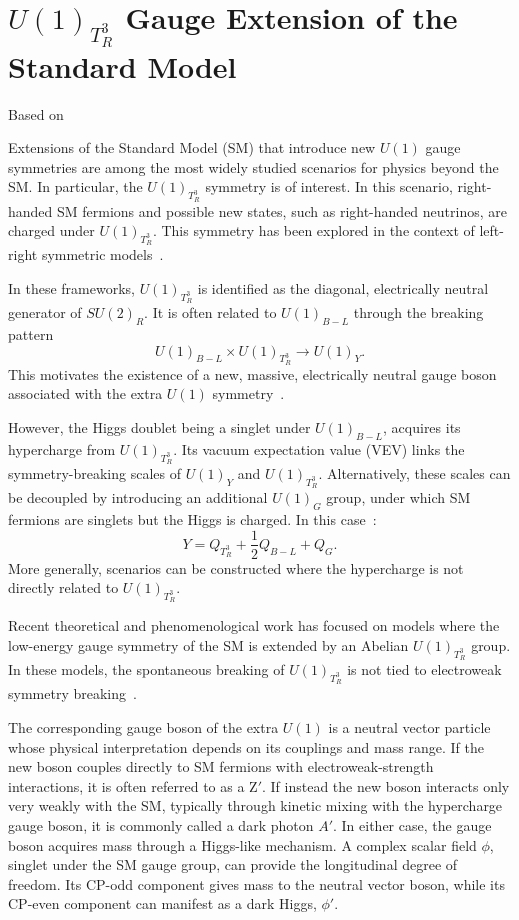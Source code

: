 \chapter{$U(1)_{T^3_R}$ Gauge Extension of the Standard Model}\label{ch:U1T3R}
\hfill{Based on~\parencite{Qureshi:2024naw}}

Extensions of the Standard Model (SM) that introduce new $U(1)$ gauge symmetries are among the most widely studied scenarios for physics beyond the SM. In particular, the $U(1)_{T^3_R}$ symmetry is of interest. In this scenario, right-handed SM fermions and possible new states, such as right-handed neutrinos, are charged under $U(1)_{T^3_R}$. This symmetry has been explored in the context of left-right symmetric models~\parencite{Assad:2017iib, MohapatraPati1975, SenjanovicMohapatra1975}.

In these frameworks, $U(1)_{T^3_R}$ is identified as the diagonal, electrically neutral generator of $SU(2)_R$. It is often related to $U(1)_{B-L}$ through the breaking pattern 
\[
U(1)_{B-L} \times U(1)_{T^3_R} \rightarrow U(1)_Y.
\]
This motivates the existence of a new, massive, electrically neutral gauge boson associated with the extra $U(1)$ symmetry~\parencite{DiLuzio2018, Baker2019, Michaels:2020fzj, Dev:2021otb, Florez2023}. 

However, the Higgs doublet being a singlet under $U(1)_{B-L}$, acquires its hypercharge from $U(1)_{T^3_R}$. Its vacuum expectation value (VEV) links the symmetry-breaking scales of $U(1)_Y$ and $U(1)_{T^3_R}$. Alternatively, these scales can be decoupled by introducing an additional $U(1)_G$ group, under which SM fermions are singlets but the Higgs is charged. In this case~\parencite{Dutta:2022qvn}:
\begin{equation}
Y=Q_{T^3_R}+\frac{1}{2}Q_{B-L} + Q_G.
\end{equation}
More generally, scenarios can be constructed where the hypercharge is not directly related to $U(1)_{T^3_R}$.

Recent theoretical and phenomenological work has focused on models where the low-energy gauge symmetry of the SM is extended by an Abelian $U(1)_{T^3_R}$ group. In these models, the spontaneous breaking of $U(1)_{T^3_R}$ is not tied to electroweak symmetry breaking~\parencite{Dutta2019, Dutta2020, Dutta2020b, Dutta2022, PhysRevD.107.095019, Dutta2023}.

The corresponding gauge boson of the extra $U(1)$ is a neutral vector particle whose physical interpretation depends on its couplings and mass range.  If the new boson couples directly to SM fermions with electroweak-strength interactions, it is often referred to as a $\textrm{Z}'$.  If instead the new boson interacts only very weakly with the SM, typically through kinetic mixing with the hypercharge gauge boson, it is commonly called a dark photon $A'$.  In either case, the gauge boson acquires mass through a Higgs-like mechanism. A complex scalar field $\phi$, singlet under the SM gauge group, can provide the longitudinal degree of freedom. Its CP-odd component gives mass to the neutral vector boson, while its CP-even component can manifest as a dark Higgs, $\phi'$.

